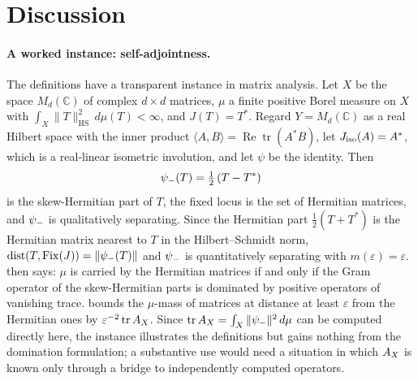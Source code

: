 \section{Discussion}
\label{sec:discussion}

\paragraph{A worked instance: self-adjointness.}
The definitions have a transparent instance in matrix analysis.  Let
\(X\) be the space \(M_d(\mathbb C)\) of complex \(d\times d\) matrices,
\(\mu\) a finite positive Borel measure on \(X\) with
\(\int_X\|T\|_{\mathrm{HS}}^2\,d\mu(T)<\infty\), and \(J(T)=T^*\).
Regard \(Y=M_d(\mathbb C)\) as a real Hilbert space with the inner
product \(\langle A,B\rangle=\operatorname{Re}\operatorname{tr}(A^*B)\),
let \(J_{\mathrm{iso}}(A)=A^*\), which is a real-linear isometric involution, and
let \(\psi\) be the identity.  Then
\[
  \psi_{-}(T)=\tfrac12\,(T-T^*)
\]
is the skew-Hermitian part of \(T\), the fixed locus is the set of
Hermitian matrices, and \(\psi_{-}\) is qualitatively separating.  Since
the Hermitian part \(\tfrac12(T+T^*)\) is the Hermitian matrix nearest
to \(T\) in the Hilbert--Schmidt norm, \(\operatorname{dist}(T,\operatorname{Fix}(J))=\|\psi_{-}(T)\|\)
and \(\psi_{-}\) is quantitatively separating with \(m(\varepsilon)=\varepsilon\).
 then says: \(\mu\) is
carried by the Hermitian matrices if and only if the Gram operator of
the skew-Hermitian parts is dominated by positive operators of
vanishing trace.  
bounds the \(\mu\)-mass of matrices at distance at least \(\varepsilon\)
from the Hermitian ones by \(\varepsilon^{-2}\operatorname{tr}A_{X}\).  Since
\(\operatorname{tr}A_{X}=\int_X\|\psi_{-}\|^2\,d\mu\) can be computed directly here,
the instance illustrates the definitions but gains nothing from the
domination formulation; a substantive use would need a situation in
which \(A_{X}\) is known only through a bridge to independently computed
operators.

